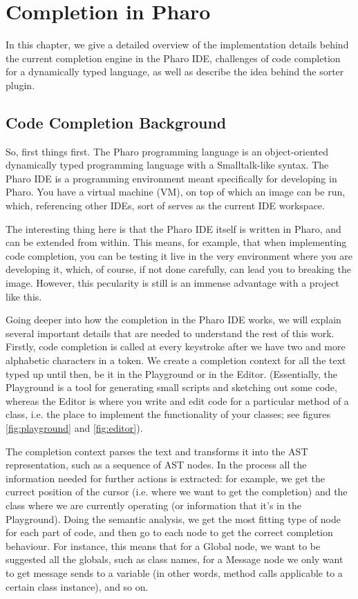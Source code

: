 \chapter{Completion in Pharo}
\label{chap:Completion in Pharo}

In this chapter, we give a detailed overview of the implementation details behind the current completion engine in the Pharo IDE, challenges of code completion for a dynamically typed language, as well as describe the idea behind the sorter plugin.

\section{Code Completion Background}
So, first things first. The Pharo programming language is an object-oriented dynamically typed programming language with a Smalltalk-like syntax. The Pharo IDE is a programming environment meant specifically for developing in Pharo. You have a virtual machine (VM), on top of which an image can be run, which, referencing other IDEs, sort of serves as the current IDE workspace.

The interesting thing here is that the Pharo IDE itself is written in Pharo, and can be extended from within. This means, for example, that when implementing code completion, you can be testing it live in the very environment where you are developing it, which, of course, if not done carefully, can lead you to breaking the image. However, this pecularity is still is an immense advantage with a project like this.

Going deeper into how the completion in the Pharo IDE works, we will explain several important details that are needed to understand the rest of this work. Firstly, code completion is called at every keystroke after we have two and more alphabetic characters in a token. We create a completion context for all the text typed up until then, be it in the Playground or in the Editor. (Essentially, the Playground is a tool for generating small scripts and sketching out some code, whereas the Editor is where you write and edit code for a particular method of a class, i.e. the place to implement the functionality of your classes; see figures \ref{fig:playground} and \ref{fig:editor}).

The completion context parses the text and transforms it into the AST representation, such as a sequence of AST nodes. In the process all the information needed for further actions is extracted: for example, we get the currect position of the cursor (i.e. where we want to get the completion) and the class where we are currently operating (or information that it's in the Playground). Doing the semantic analysis, we get the most fitting type of node for each part of code, and then go to each node to get the correct completion behaviour. For instance, this means that for a Global node, we want to be suggested all the globals, such as class names, for a Message node we only want to get message sends to a variable (in other words, method calls applicable to a certain class instance), and so on.

